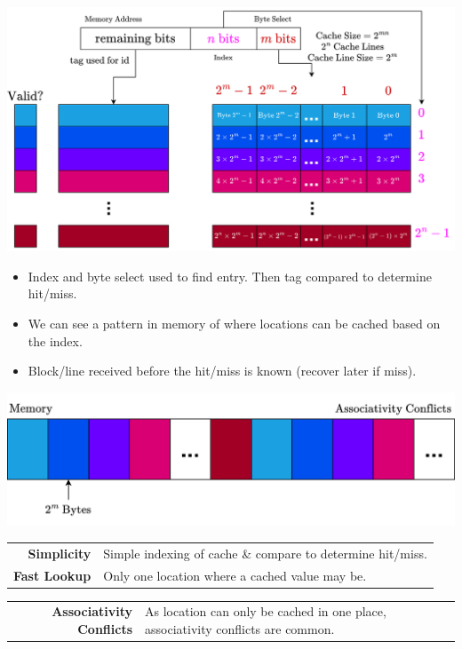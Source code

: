 \begin{center}
	\includegraphics[width=.9\textwidth]{caches/images/direct_mapped_cache.drawio.png}
\end{center}
\begin{itemize}
	\item Index and byte select used to find entry. Then tag compared to determine hit/miss.
	\item We can see a pattern in memory of where locations can be cached based on the index.
	\item Block/line received before the hit/miss is known (recover later if miss).
\end{itemize}
\begin{center}
	\includegraphics[width=.9\textwidth]{caches/images/associativity_conflicts.drawio.png}
\end{center}
\begin{prosbox}
	\begin{center}
		\begin{tabular}{r p{}}
			\textbf{Simplicity}  & Simple indexing of cache \& compare to determine hit/miss. \\
			\textbf{Fast Lookup} & Only one location where a cached value may be.             \\
		\end{tabular}
	\end{center}
\end{prosbox}
\begin{consbox}
	\begin{center}
		\begin{tabular}{r p{}}
			\textbf{Associativity Conflicts} & As location can only be cached in one place, associativity conflicts are common. \\
		\end{tabular}
	\end{center}
\end{consbox}

